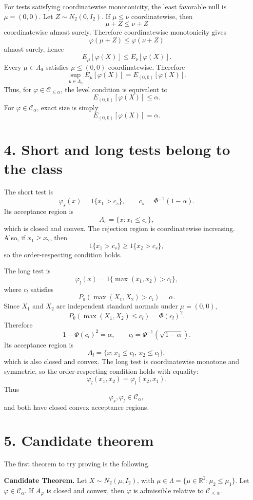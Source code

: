 \documentclass[11pt]{article}
\begin{document}
For tests satisfying coordinatewise monotonicity, the least favorable null is \(\mu=(0,0)\). Let \(Z\sim N_2(0,I_2)\). If \(\mu\le\nu\) coordinatewise, then
\[
\mu+Z\le \nu+Z
\]
coordinatewise almost surely. Therefore coordinatewise monotonicity gives
\[
\varphi(\mu+Z)\le \varphi(\nu+Z)
\]
almost surely, hence
\[
E_\mu[\varphi(X)]\le E_\nu[\varphi(X)].
\]
Every \(\mu\in\Lambda_0\) satisfies \(\mu\le (0,0)\) coordinatewise. Therefore
\[
\sup_{\mu\in\Lambda_0}E_\mu[\varphi(X)]
=
E_{(0,0)}[\varphi(X)].
\]
Thus, for \(\varphi\in\mathcal C_{\le\alpha}\), the level condition is equivalent to
\[
E_{(0,0)}[\varphi(X)]\le\alpha.
\]
For \(\varphi\in\mathcal C_\alpha\), exact size is simply
\[
E_{(0,0)}[\varphi(X)]=\alpha.
\]

\section*{4. Short and long tests belong to the class}

The short test is
\[
\varphi_s(x)=1\{x_1>c_s\},
\qquad
c_s=\Phi^{-1}(1-\alpha).
\]
Its acceptance region is
\[
A_s=\{x:x_1\le c_s\},
\]
which is closed and convex. The rejection region is coordinatewise increasing. Also, if \(x_1\ge x_2\), then
\[
1\{x_1>c_s\}\ge 1\{x_2>c_s\},
\]
so the order-respecting condition holds.

The long test is
\[
\varphi_l(x)=1\{\max(x_1,x_2)>c_l\},
\]
where \(c_l\) satisfies
\[
P_0(\max(X_1,X_2)>c_l)=\alpha.
\]
Since \(X_1\) and \(X_2\) are independent standard normals under \(\mu=(0,0)\),
\[
P_0(\max(X_1,X_2)\le c_l)=\Phi(c_l)^2.
\]
Therefore
\[
1-\Phi(c_l)^2=\alpha,
\qquad
c_l=\Phi^{-1}(\sqrt{1-\alpha}).
\]
Its acceptance region is
\[
A_l=\{x:x_1\le c_l,
\ x_2\le c_l\},
\]
which is also closed and convex. The long test is coordinatewise monotone and symmetric, so the order-respecting condition holds with equality:
\[
\varphi_l(x_1,x_2)=\varphi_l(x_2,x_1).
\]
Thus
\[
\varphi_s,\varphi_l\in\mathcal C_\alpha,
\]
and both have closed convex acceptance regions.

\section*{5. Candidate theorem}

The first theorem to try proving is the following.

\medskip
\noindent
\textbf{Candidate Theorem.}
Let \(X\sim N_2(\mu,I_2)\), with \(\mu\in\Lambda=\{\mu\in\mathbb R^2:\mu_2\le\mu_1\}\). Let \(\varphi\in\mathcal C_\alpha\). If \(A_\varphi\) is closed and convex, then \(\varphi\) is admissible relative to \(\mathcal C_{\le\alpha}\).
\end{document}

